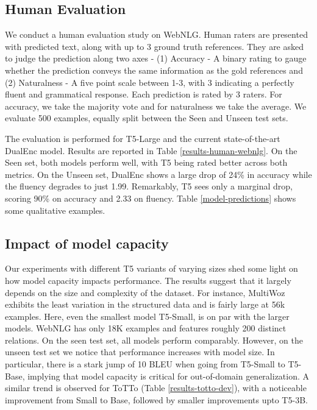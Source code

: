 \documentclass[11pt,a4paper]{article}
\begin{document}
\subsection{Human Evaluation}
We conduct a human evaluation study on WebNLG. Human raters are presented with predicted text, along with up to 3 ground truth references. They are asked to judge the prediction along two axes - (1) Accuracy - A binary rating to gauge whether the prediction conveys the same information as the gold references and (2) Naturalness - A five point scale between 1-3, with 3 indicating a perfectly fluent and grammatical response. Each prediction is rated by 3 raters. For accuracy, we take the majority vote and for naturalness we take the average.
We evaluate 500 examples, equally split between the Seen and Unseen test sets.
\par The evaluation is performed for T5-Large and the current state-of-the-art DualEnc model. Results are reported in Table \ref{results-human-webnlg}. On the Seen set, both models perform well, with T5 being rated  better across both metrics. On the Unseen set, DualEnc shows a large drop of 24\% in accuracy while the fluency degrades to just 1.99. Remarkably, T5 sees only a marginal drop, scoring 90\% on accuracy and 2.33 on fluency. Table \ref{model-predictions} shows some qualitative examples.




\subsection{Impact of model capacity}
Our experiments with different T5 variants of varying sizes shed some light on how model capacity impacts performance. The results suggest that it largely depends on the size and complexity of the dataset. 
For instance, MultiWoz exhibits the least variation in the structured data and is fairly large at 56k examples. Here, even the smallest model T5-Small, is on par with the larger models. 
WebNLG has only 18K examples and features roughly 200 distinct relations. On the seen test set, all models perform comparably. However, on the unseen test set we notice that performance increases with model size. In particular, there is a stark jump of 10 BLEU when going from T5-Small to T5-Base, implying that model capacity is critical for out-of-domain generalization. A similar trend is observed for ToTTo (Table \ref{results-totto-dev}), with a noticeable improvement from Small to Base, followed by smaller improvements upto T5-3B.
\end{document}
